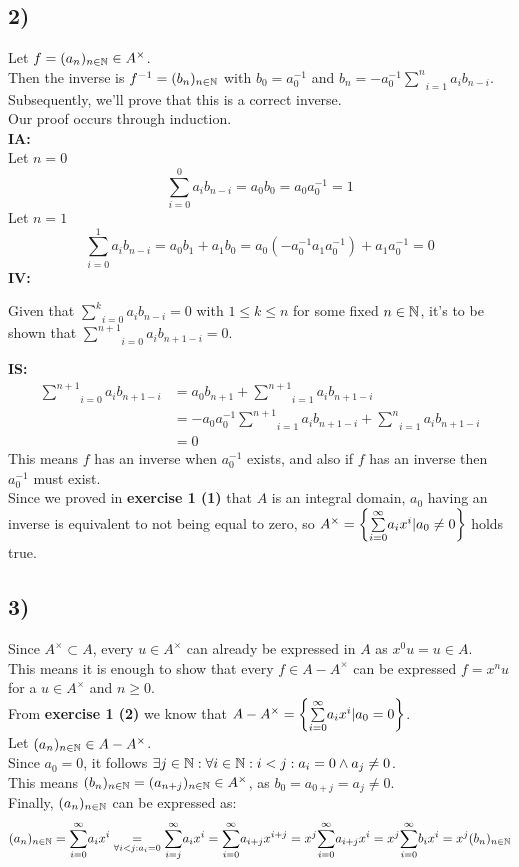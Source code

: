 \documentclass[a4paper]{scrartcl}
\begin{document}
\subsection*{2)}
Let $f=(a_n)_{n\in\mathbb{N}}\in A^\times$.\\
Then the inverse is $f^{-1}=(b_n)_{n\in\mathbb{N}}$ with $b_0=a_0^{-1}$ and $b_n=-a_0^{-1}\underset{i=1}{\overset{n}{\sum}}a_ib_{n-i}$.\\
Subsequently, we'll prove that this is a correct inverse.\\
Our proof occurs through induction.\\
\textbf{IA:}\\
Let $n=0$
\[\underset{i=0}{\overset{0}{\sum}}a_ib_{n-i}=a_0b_0=a_0a_0^{-1}=1\]
Let $n=1$
\[\underset{i=0}{\overset{1}{\sum}}a_ib_{n-i}=a_0b_1+a_1b_0=a_0(-a_0^{-1}a_1a_0^{-1})+a_1a_0^{-1}=0\]
\textbf{IV:}
\begin{center}
    Given that $\underset{i=0}{\overset{k}{\sum}}a_ib_{n-i}=0$ with $1\leq k\leq n$ for some fixed $n\in\mathbb{N}$, it's to be shown that $\underset{i=0}{\overset{n+1}{\sum}}a_ib_{n+1-i}=0$.
\end{center}
\textbf{IS:}
\begin{align*}
    \underset{i=0}{\overset{n+1}{\sum}}a_ib_{n+1-i}&=a_0b_{n+1}+\underset{i=1}{\overset{n+1}{\sum}}a_ib_{n+1-i}\\
    &=-a_0a_0^{-1}\underset{i=1}{\overset{n+1}{\sum}}a_ib_{n+1-i}+\underset{i=1}{\overset{n}{\sum}}a_ib_{n+1-i}\\
    &=0
\end{align*}
This means $f$ has an inverse when $a_0^{-1}$ exists, and also if $f$ has an inverse then $a_0^{-1}$ must exist.\\
Since we proved in \textbf{exercise 1 (1)} that $A$ is an integral domain, $a_0$ having an inverse is equivalent to not being equal to zero, so $A^\times=\left\lbrace \underset{i=0}{\overset{\infty}{\sum}}a_ix^i|a_0\neq0 \right\rbrace$ holds true.
\subsection*{3)}
Since $A^\times\subset A$, every $u\in A^\times$ can already be expressed in $A$ as $x^0u=u\in A$.\\
This means it is enough to show that every $f\in A-A^\times$ can be expressed $f=x^nu$ for a $u\in A^\times$ and $n\geq0$.\\
From \textbf{exercise 1 (2)} we know that $A-A^\times=\left\lbrace \underset{i=0}{\overset{\infty}{\sum}}a_ix^i|a_0=0 \right\rbrace$.\\
Let $(a_n)_{n\in\mathbb{N}}\in A-A^\times$.\\
Since $a_0=0$, it follows $\exists j\in\mathbb{N}:\forall i\in\mathbb{N}:i<j:a_i=0\wedge a_j\neq0$.\\
This means $(b_n)_{n\in\mathbb{N}}=(a_{n+j})_{n\in\mathbb{N}}\in A^\times$, as $b_0=a_{0+j}=a_j\neq0$.\\
Finally, $(a_n)_{n\in\mathbb{N}}$ can be expressed as:
\[(a_n)_{n\in\mathbb{N}}=\underset{i=0}{\overset{\infty}{\sum}}a_ix^i\underset{\forall i<j:a_i=0}{=}\underset{i=j}{\overset{\infty}{\sum}}a_{i}x^{i}=\underset{i=0}{\overset{\infty}{\sum}}a_{i+j}x^{i+j}=x^j\underset{i=0}{\overset{\infty}{\sum}}a_{i+j}x^{i}=x^j\underset{i=0}{\overset{\infty}{\sum}}b_ix^i=x^j(b_n)_{n\in\mathbb{N}}\]
\end{document}
